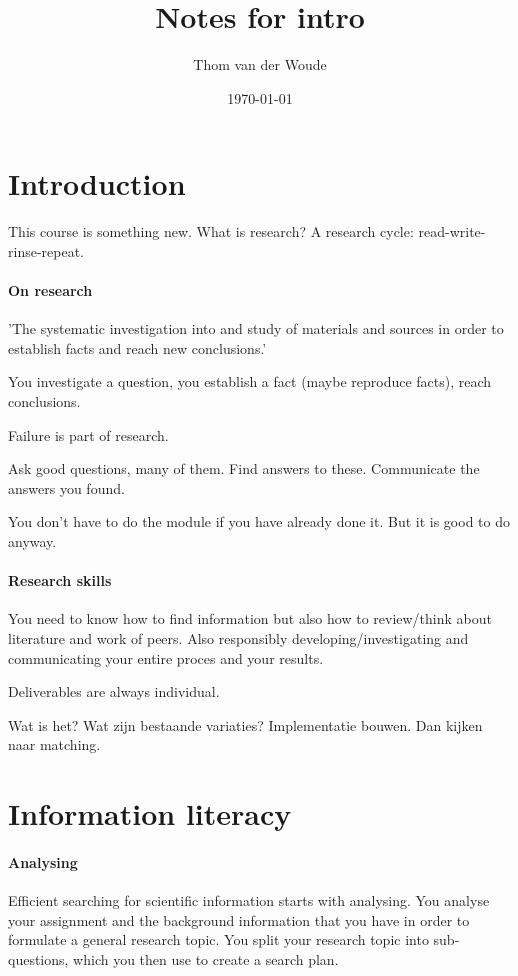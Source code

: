 \documentclass[11pt]{report}
\title{Notes for intro}
\author{Thom van der Woude}
\date{\today}
\begin{document}
 \maketitle
 \section{Introduction}
 This course is something new. What is research? A research cycle: read-write-rinse-repeat.
 \paragraph{On research}
 'The systematic investigation into and study of materials and sources in order to establish facts and reach new conclusions.'

 You investigate a question, you establish a fact (maybe reproduce facts), reach conclusions.

 Failure is part of research.

 Ask good questions, many of them. Find answers to these. Communicate the answers you found.

 You don't have to do the module if you have already done it. But it is good to do anyway.
 
 \paragraph{Research skills}
 You need to know how to find information but also how to review/think about literature and work of peers. Also responsibly developing/investigating and communicating your entire proces and your results.


 Deliverables are always individual.



 Wat is het? Wat zijn bestaande variaties? Implementatie bouwen. Dan kijken naar matching.
 
\section{Information literacy}

\paragraph{Analysing}
Efficient searching for scientific information starts with analysing. You analyse your assignment and the background information that you have in order to formulate a general research topic. You split your research topic into sub-questions, which you then use to create a search plan.
 
\end{document}
